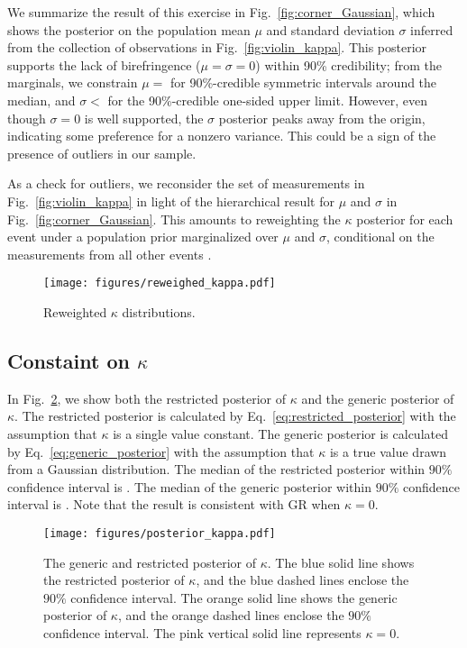 \documentclass[aps,prd,twocolumn,superscriptaddress,preprintnumbers,floatfix,nofootinbib]{revtex4-2}
\begin{document}
We summarize the result of this exercise in Fig.~\ref{fig:corner_Gaussian}, which shows the posterior on the population mean $\mu$ and standard deviation $\sigma$ inferred from the collection of observations in Fig.~\ref{fig:violin_kappa}.
This posterior supports the lack of birefringence ($\mu = \sigma = 0$) within 90\% credibility; from the marginals, we constrain $\mu =$  for 90\%-credible symmetric intervals around the median, and $\sigma <$  for the 90\%-credible one-sided upper limit.
However, even though $\sigma = 0$ is well supported, the $\sigma$ posterior peaks away from the origin, indicating some preference for a nonzero variance.
This could be a sign of the presence of outliers in our sample.

As a check for outliers, we reconsider the set of measurements in Fig.~\ref{fig:violin_kappa} in light of the hierarchical result for $\mu$ and $\sigma$ in Fig.~\ref{fig:corner_Gaussian}.
This amounts to reweighting the $\kappa$ posterior for each event under a population prior marginalized over $\mu$ and $\sigma$, conditional on the measurements from all other events \cite{Callister:T2100301}.

\begin{figure}
    \texttt{[image: figures/reweighed\_kappa.pdf]}
    \caption{Reweighted $\kappa$ distributions.}
    \label{fig:reweighted_kappa}
\end{figure}

\subsection{Constaint on $\kappa$}
In Fig.~\ref{fig:posterior_kappa}, we show both the restricted posterior of $\kappa$ and the generic posterior of $\kappa$.
The restricted posterior is calculated by Eq.~\eqref{eq:restricted_posterior} with the assumption that $\kappa$ is a single value constant.
The generic posterior is calculated by Eq.~\eqref{eq:generic_posterior} with the assumption that $\kappa$ is a true value drawn from a Gaussian distribution.
The median of the restricted posterior within $90\%$ confidence interval is .
The median of the generic posterior within $90\%$ confidence interval is .
Note that the result is consistent with GR when $\kappa=0$.

\begin{figure}
    \texttt{[image: figures/posterior\_kappa.pdf]}
    \caption{
        The generic and restricted posterior of $\kappa$.
        The blue solid line shows the restricted posterior of $\kappa$, and the blue dashed lines enclose the $90\%$ confidence interval.
        The orange solid line shows the generic posterior of $\kappa$, and the orange dashed lines enclose the $90\%$ confidence interval.
        The pink vertical solid line represents $\kappa=0$.
    }
    \label{fig:posterior_kappa}
\end{figure}
\end{document}
